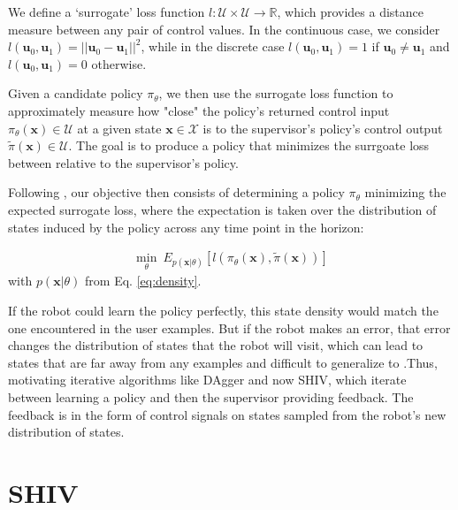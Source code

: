 \documentclass[10pt, conference]{ieeeconf}      %
\newcommand{\bu}{\mathbf{u}}
\newcommand{\bx}{\mathbf{x}}
\begin{document}
We define a `surrogate' loss function $l:\mathcal{U}\times \mathcal{U}\to \mathbb{R}$, which provides a distance
measure between any pair of control values. In the continuous case, we consider $l(\bu_0,\bu_1) = ||\bu_0-\bu_1||^2$,
while in the discrete case $l(\bu_0,\bu_1) = 1$ if $\bu_0 \neq \bu_1$ and $l(\bu_0, \bu_1)=0$ otherwise.

Given a candidate policy $\pi_{\theta}$, we then use the surrogate loss function to approximately measure how "close" the policy's
returned control input $\pi_{\theta}(\bx)\in \mathcal{U}$ at a given state $\bx\in \mathcal{X}$ is to the supervisor's policy's control output
$\tilde{\pi}(\bx)\in \mathcal{U}$. The goal is to produce a policy that minimizes the surrgoate loss between relative to the supervisor's policy.


Following \cite{ross2010reduction}, our objective then consists of determining a policy $\pi_{\theta}$ minimizing the expected surrogate loss, where the expectation is taken over the distribution of states induced by the policy across any time point in the horizon:

 \vspace{-2ex}
\begin{align}\label{eq:LFD_obj}
\underset{\theta}{\min} \: E_{p(\bx|\theta)} [l(\pi_\theta(\bx),\tilde{\pi}(\bx))]
\end{align}
with $p(\bx|\theta)$ from Eq. \ref{eq:density}.

 If the robot could learn the policy  perfectly, this state density would match the one encountered in the user examples. But if the robot makes an error, that error changes the distribution of states that the robot will visit, which can lead to states that are far away from any examples and difficult to generalize to \cite{pomerleau1989alvinn}.Thus, motivating iterative algorithms like DAgger and now SHIV, which iterate between learning a policy and then the supervisor providing feedback. The feedback is in the form of control signals on states sampled from the robot's new distribution of states. 


\section{SHIV} \label{sec:SHIV}
\end{document}
